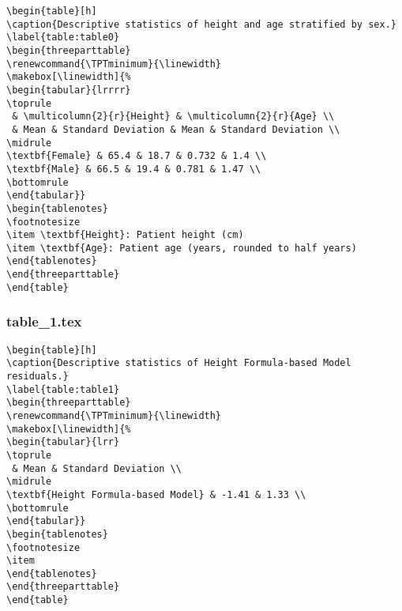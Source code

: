 \documentclass[11pt]{article}
\begin{document}
\begin{Verbatim}[tabsize=4]
\begin{table}[h]
\caption{Descriptive statistics of height and age stratified by sex.}
\label{table:table0}
\begin{threeparttable}
\renewcommand{\TPTminimum}{\linewidth}
\makebox[\linewidth]{%
\begin{tabular}{lrrrr}
\toprule
 & \multicolumn{2}{r}{Height} & \multicolumn{2}{r}{Age} \\
 & Mean & Standard Deviation & Mean & Standard Deviation \\
\midrule
\textbf{Female} & 65.4 & 18.7 & 0.732 & 1.4 \\
\textbf{Male} & 66.5 & 19.4 & 0.781 & 1.47 \\
\bottomrule
\end{tabular}}
\begin{tablenotes}
\footnotesize
\item \textbf{Height}: Patient height (cm)
\item \textbf{Age}: Patient age (years, rounded to half years)
\end{tablenotes}
\end{threeparttable}
\end{table}

\end{Verbatim}

\subsubsection*{table\_1.tex}

\begin{Verbatim}[tabsize=4]
\begin{table}[h]
\caption{Descriptive statistics of Height Formula-based Model residuals.}
\label{table:table1}
\begin{threeparttable}
\renewcommand{\TPTminimum}{\linewidth}
\makebox[\linewidth]{%
\begin{tabular}{lrr}
\toprule
 & Mean & Standard Deviation \\
\midrule
\textbf{Height Formula-based Model} & -1.41 & 1.33 \\
\bottomrule
\end{tabular}}
\begin{tablenotes}
\footnotesize
\item
\end{tablenotes}
\end{threeparttable}
\end{table}

\end{Verbatim}
\end{document}
